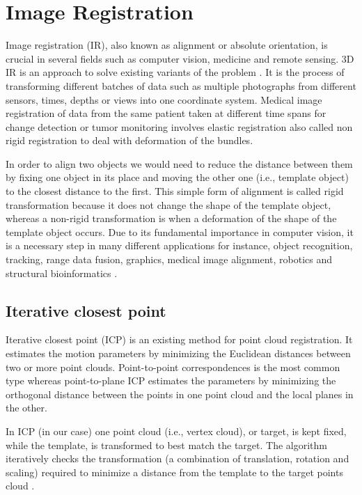 \documentclass[../structure.tex]{subfiles}
\begin{document}
\section{Image Registration}
Image registration (IR), also known as alignment or absolute orientation, is crucial in several fields such as computer vision, medicine and remote sensing. 3D IR is an approach to solve existing variants of the problem \cite{Cord_n_2006}. It is the process of transforming different batches of data such as multiple photographs from different sensors, times, depths or views into one coordinate system. Medical image registration of data from the same patient taken at different time spans for change detection or tumor monitoring involves elastic registration also called non rigid registration to deal with deformation of the bundles.

In order to align two objects we would need to reduce the distance between them by fixing one object in its place and moving the other one (i.e., template object) to the closest distance to the first. This simple form of alignment is called rigid transformation because it does not change the shape of the template object, whereas a non-rigid transformation is when a deformation of the shape of the template object occurs. Due to its fundamental importance in computer vision, it is a necessary step in many different applications for instance, object recognition, tracking, range data fusion, graphics, medical image alignment, robotics and structural bioinformatics \cite{Li2007}.

\subsection{Iterative closest point}
		
Iterative closest point (ICP) is an existing method for point cloud registration. It estimates the motion parameters by minimizing the Euclidean distances between two or more point clouds. Point-to-point correspondences is the most common type whereas point-to-plane ICP estimates the parameters by minimizing the orthogonal distance between the points in one point cloud and the local planes in the other.
		
In ICP (in our case) one point cloud (i.e., vertex cloud), or target, is kept fixed, while the template, is transformed to best match the target. The algorithm iteratively checks the transformation (a combination of translation, rotation and scaling) required to minimize a distance from the template to the target points cloud \cite{Zhang_1994}.
\end{document}
